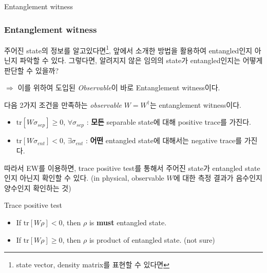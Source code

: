 \documentclass[9pt]{beamer}
\begin{document}
    \begin{section}{Entanglement witness}
        \begin{frame}
            \frametitle{Entanglement witness}
            주어진 state의 정보를 알고있다면\footnote{state vector, density matrix를 표현할 수 있다면}, 앞에서 소개한 방법을 활용하여 entangled인지 아닌지 파악할 수 있다. 그렇다면, 알려지지 않은 임의의 state가 entangled인지는 어떻게 판단할 수 있을까?
            
            \vspace{0.2cm}
            $\Rightarrow$ 이를 위하여 도입된 \textit{Observable}이 바로 Entanglement witness이다.
            \begin{definition}
                다음 2가지 조건을 만족하는 \textit{observable} $W = W^\dagger$는 entanglement witness이다.
                \begin{itemize}
                    \item $\text{tr}[W \sigma_{sep}] \ge 0$, $\forall \sigma_{sep}$ : \textbf{모든} separable state에 대해 positive trace를 가진다.
                    \item $\text{tr}[W \sigma_{ent}] < 0$, $\exists \sigma_{ent}$ : \textbf{어떤} entangled state에 대해서는 negative trace를 가진다.
                \end{itemize}
            \end{definition}
            
            \vspace{0.2cm}
            따라서 EW를 이용하면, trace positive test를 통해서 주어진 state가 entangled state인지 아닌지 확인할 수 있다. (in physical, observable $W$에 대한 측정 결과가 음수인지 양수인지 확인하는 것)
            \begin{block}{Trace positive test}
                \begin{itemize}
                    \item If $\text{tr} [W\rho] < 0$, then $\rho$ is \textbf{must} entangled state.
                    \item If $\text{tr} [W\rho] \ge 0$, then $\rho$ is product of entangled state. (not sure)
                \end{itemize}    
            \end{block}
        \end{frame}
        

\end{section}
\end{document}
